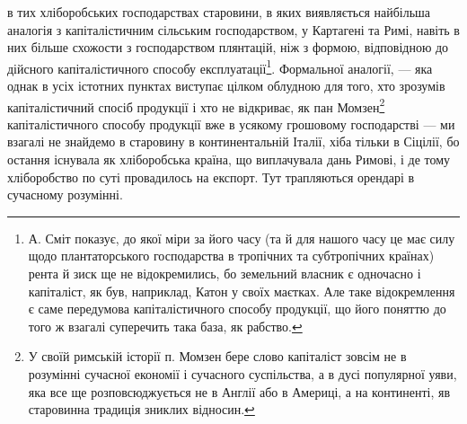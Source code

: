в тих хліборобських господарствах старовини, в яких виявляється найбільша
аналогія з капіталістичним сільським господарством, у Картагені та Римі,
навіть в них більше схожости з господарством плянтацій, ніж з формою, відповідною
до дійсного капіталістичного способу експлуатації\footnote{
А. Сміт показує, до якої міри за його часу (та й для нашого часу це має силу щодо
плантаторського господарства в тропічних та субтропічних країнах) рента й зиск ще не відокремились,
бо земельний власник є одночасно і капіталіст, як був, наприклад, Катон у своїх маєтках. Але таке
відокремлення є саме передумова капіталістичного способу продукції, що його поняттю до того ж
взагалі суперечить така база, як рабство.
}. Формальної аналогії,
— яка однак в усіх істотних пунктах виступає цілком облудною для того,
хто зрозумів капіталістичний спосіб продукції і хто не відкриває, як пан Момзен\footnote{
У своїй римській історії п. Момзен бере слово капіталіст зовсім не в розумінні сучасної економії
і сучасного суспільства, а в дусі популярної уяви, яка все ще розповсюджується не в Англії або в
Америці, а на континенті, яв старовинна традиція зниклих відносин.
}
капіталістичного способу продукції вже в усякому грошовому господарстві —
ми взагалі не знайдемо в старовину в континентальній Італії, хіба тільки в Сіцілії,
бо остання існувала як хліборобська країна, що виплачувала дань Римові,
і де тому хліборобство по суті провадилось на експорт. Тут трапляються орендарі
в сучасному розумінні.

